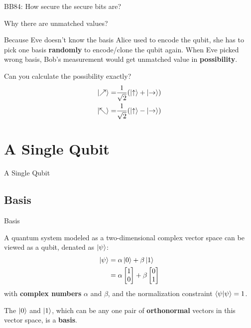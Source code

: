 \documentclass{beamer}
\begin{document}
\begin{frame}[fragile]{BB84: How secure the secure bits are?}

  \begin{block}{Why there are unmatched values?}
    {\scriptsize
      Because Eve doesn't know the basis Alice used to encode the qubit, she has to pick one basis \textbf{randomly} to encode/clone the qubit again. 
      When Eve picked wrong basis, Bob's measurement would get unmatched value in \textbf{possibility}.
      \par
      Can you calculate the possibility exactly?
      \begin{align*}
        \ket{\nearrow} =& \frac{1}{\sqrt{2}}(\ket{\uparrow} + \ket{\rightarrow}) \\
        \ket{\nwarrow} =& \frac{1}{\sqrt{2}}(\ket{\uparrow} - \ket{\rightarrow})
      \end{align*}
    }%
  \end{block}
\end{frame}

\section{A Single Qubit}
\begin{frame}
  A Single Qubit
\end{frame}
\subsection{Basis}
\begin{frame}{Basis}
  {\tiny
  A quantum system modeled as a two-dimensional complex vector space can be viewed as a qubit, denated as $\ket{\psi}$:
  \begin{align*}
    \ket{\psi}&=\alpha\ket{0}+\beta\ket{1} \\
              &=\alpha\begin{bmatrix}1\\0\end{bmatrix}+\beta\begin{bmatrix}0\\1\end{bmatrix}
  \end{align*}
  with \textbf{complex numbers} $\alpha$ and $\beta$, and the normalization constraint $\braket{\psi|\psi}=1$.
  \par
  The $\ket{0}$ and $\ket{1}$, which can be any one pair of \textbf{orthonormal} vectors in this vector space, is a \textbf{basis}.
  }%
\end{frame}
\end{document}
